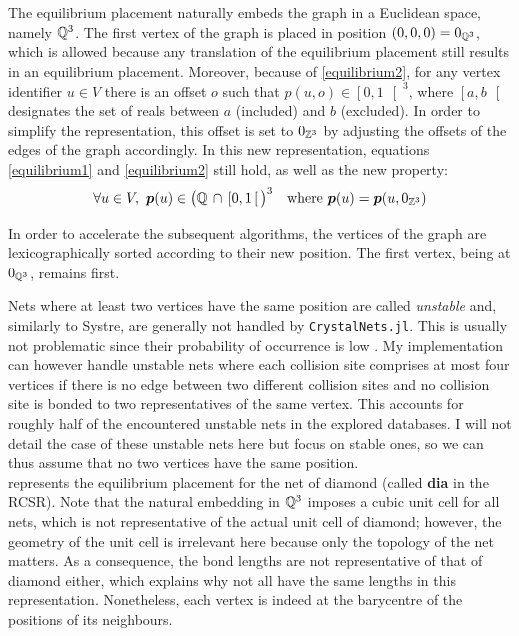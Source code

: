 \documentclass[main.tex]{subfiles}
\begin{document}
The equilibrium placement naturally embeds the graph in a Euclidean space, namely $\mathbb{Q}^3$. The first vertex of the graph is placed in position $(0,0,0) = 0_{\mathbb{Q}^3}$, which is allowed because any translation of the equilibrium placement still results in an equilibrium placement.
Moreover, because of \cref{equilibrium2}, for any vertex identifier $u\in V$ there is an offset $o$ such that $p(u,o)\in\left[0,1\,\right[^3$, where $\left[a,b\,\right[$ designates the set of reals between $a$ (included) and $b$ (excluded). In order to simplify the representation, this offset is set to $0_{\mathbb{Z}^3}$ by adjusting the offsets of the edges of the graph accordingly. In this new representation, equations \ref{equilibrium1} and \ref{equilibrium2} still hold, as well as the new property:
\[\forall u\in V,\ \boldsymbol p(u)\in \big(\Q\,\cap\,\left[0,1\,\right[\big)^3\quad\t{where }\boldsymbol p(u) = \boldsymbol p(u,\OZ)\]

In order to accelerate the subsequent algorithms, the vertices of the graph are lexicographically sorted according to their new position. The first vertex, being at $0_{\mathbb{Q}^3}$, remains first.

Nets where at least two vertices have the same position are called \emph{unstable} and, similarly to Systre, are generally not handled by \texttt{CrystalNets.jl}. This is usually not problematic since their probability of occurrence is low \autocite{unstableNets}. My implementation can however handle unstable nets where each collision site comprises at most four vertices if there is no edge between two different collision sites and no collision site is bonded to two representatives of the same vertex. This accounts for roughly half of the encountered unstable nets in the explored databases. I will not detail the case of these unstable nets here but focus on stable ones, so we can thus assume that no two vertices have the same position.\\

 represents the equilibrium placement for the net of diamond (called {\bf dia} in the RCSR). Note that the natural embedding in $\mathbb{Q}^3$ imposes a cubic unit cell for all nets, which is not representative of the actual unit cell of diamond; however, the geometry of the unit cell is irrelevant here because only the topology of the net matters. As a consequence, the bond lengths are not representative of that of diamond either, which explains why not all have the same lengths in this representation. Nonetheless, each vertex is indeed at the barycentre of the positions of its neighbours.
\end{document}
